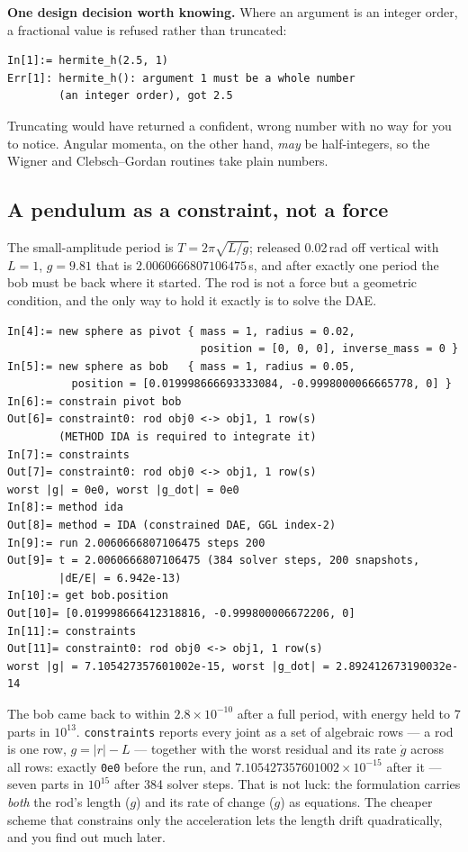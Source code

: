\documentclass[11pt]{article}
\newcommand{\code}[1]{\texttt{#1}}
\begin{document}
\textbf{One design decision worth knowing.} Where an argument is an
integer order, a fractional value is refused rather than truncated:

\begin{lstlisting}
In[1]:= hermite_h(2.5, 1)
Err[1]: hermite_h(): argument 1 must be a whole number
        (an integer order), got 2.5
\end{lstlisting}

Truncating would have returned a confident, wrong number with no way for
you to notice. Angular momenta, on the other hand, \emph{may} be
half-integers, so the Wigner and Clebsch--Gordan routines take plain
numbers.

\subsection{A pendulum as a constraint, not a force}

The small-amplitude period is $T = 2\pi\sqrt{L/g}$; released 0.02\,rad
off vertical with $L=1$, $g=9.81$ that is $2.0060666807106475$\,s, and
after exactly one period the bob must be back where it started. The rod
is not a force but a geometric condition, and the only way to hold it
exactly is to solve the DAE.

\begin{lstlisting}
In[4]:= new sphere as pivot { mass = 1, radius = 0.02,
                              position = [0, 0, 0], inverse_mass = 0 }
In[5]:= new sphere as bob   { mass = 1, radius = 0.05,
          position = [0.019998666693333084, -0.9998000066665778, 0] }
In[6]:= constrain pivot bob
Out[6]= constraint0: rod obj0 <-> obj1, 1 row(s)
        (METHOD IDA is required to integrate it)
In[7]:= constraints
Out[7]= constraint0: rod obj0 <-> obj1, 1 row(s)
worst |g| = 0e0, worst |g_dot| = 0e0
In[8]:= method ida
Out[8]= method = IDA (constrained DAE, GGL index-2)
In[9]:= run 2.0060666807106475 steps 200
Out[9]= t = 2.0060666807106475 (384 solver steps, 200 snapshots,
        |dE/E| = 6.942e-13)
In[10]:= get bob.position
Out[10]= [0.019998666412318816, -0.999800006672206, 0]
In[11]:= constraints
Out[11]= constraint0: rod obj0 <-> obj1, 1 row(s)
worst |g| = 7.105427357601002e-15, worst |g_dot| = 2.892412673190032e-14
\end{lstlisting}

The bob came back to within $2.8\times10^{-10}$ after a full period, with
energy held to 7 parts in $10^{13}$. \code{constraints} reports every
joint as a set of algebraic rows --- a rod is one row, $g = |r| - L$ ---
together with the worst residual and its rate $\dot g$ across all rows:
exactly \code{0e0} before the run, and $7.105427357601002\times10^{-15}$
after it --- seven parts in $10^{15}$ after 384 solver steps. That is not
luck: the formulation carries \emph{both} the rod's length ($g$) and its
rate of change ($\dot g$) as equations. The cheaper scheme that
constrains only the acceleration lets the length drift quadratically, and
you find out much later.
\end{document}
